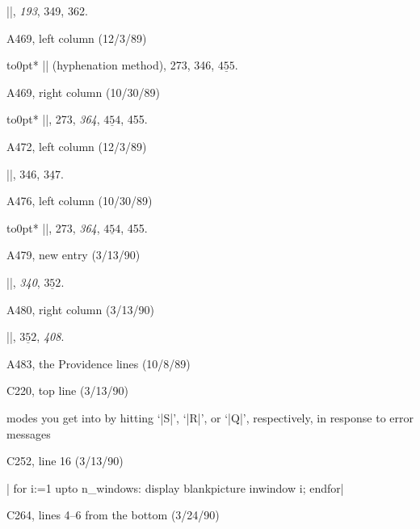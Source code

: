 {\eightpoint
|\interdisplaylinepenalty|, {\it193}, 349, 362.

\bugonpage A469, left column (12/3/89)

\eightpoint\indent\hbox to0pt{\hss{}\hbox{*}}%
|\language| (hyphenation method), 273, 346, $\underline{455}$.

\bugonpage A469, right column (10/30/89)

\eightpoint\indent\hbox to0pt{\hss{}\hbox{*}}%
|\lefthyphenmin|, 273, {\it364}, $\underline{454}$, 455.

\bugonpage A472, left column (12/3/89)

\eightpoint
|\newlanguage|, 346, $\underline{347}$.

\bugonpage A476, left column (10/30/89)

\eightpoint\indent\hbox to0pt{\hss{}\hbox{*}}%
|\righthyphenmin|, 273, {\it364}, $\underline{454}$, 455.

\bugonpage A479, new entry (3/13/90)

\eightpoint
|\topglue|, {\it340}, $\underline{352}$.

\bugonpage A480, right column (3/13/90)

\eightpoint
|\vglue|, $\underline{352}$, {\it408}.

\bugonpage A483, the Providence lines (10/8/89)


\hsize=35pc
\def\\#1{\hbox{\it#1\/\kern.05em}} %
\def\to{\mathrel{.\,.}} %


\hsize=29pc
\def\\#1{\hbox{\it#1\/\kern.05em}} %

\bugonpage C220, top line (3/13/90)

\ninepoint\noindent
modes you get into by hitting
`|S|', `|R|', or `|Q|', respectively, in response to error messages\cutpar

\bugonpage C252, line 16 (3/13/90)

\ninepoint\indent
| for i:=1 upto n_windows: display blankpicture inwindow i; endfor|

\bugonpage C264, lines 4--6 from the bottom (3/24/90)

}
